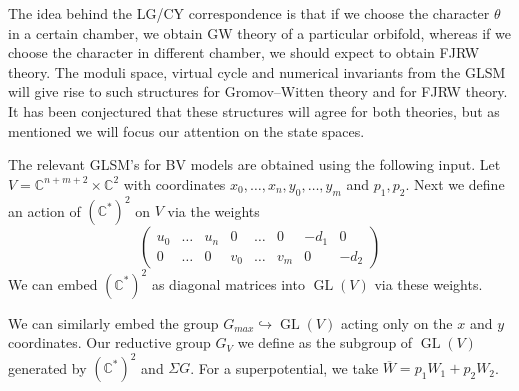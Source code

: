 \documentclass[10pt, letterpaper]{amsart}
\theoremstyle{remark}
\newcommand{\CC}{\mathbb C}
\newcommand{\QQ}{\mathbb{Q}}
\newcommand{\cX}{\mathcal{X}}
\newcommand{\sH}{\mathscr{H}}
\newcommand{\s}[1]{\Sigma #1}
\DeclareMathOperator{\GL}{GL}
\newcommand{\nathan}[1]{\todo[color=pistachio,fancyline]{N:#1}}
\begin{document}
The idea behind the LG/CY correspondence is that if we choose the character $\theta$ in a certain chamber, we obtain GW theory of a particular orbifold, whereas if we choose the character in different chamber, we should expect to obtain FJRW theory. 
The moduli space, virtual cycle and numerical invariants from the GLSM will give rise to such structures for Gromov--Witten theory and for FJRW theory. It has been conjectured that these structures will agree for both theories, but as mentioned we will focus our attention on the state spaces. 



The relevant GLSM's for BV models are obtained using the following input. Let $V=\CC^{n+m+2}\times \CC^2$ with coordinates $x_0,\dots,x_n,y_0,\dots,y_m$ and $p_1,p_2$. Next we define an action of $(\CC^*)^2$ on $V$ via the weights
\[
\left(\begin{matrix}
u_0 & \dots & u_n & 0 & \dots & 0 & -d_1 & 0\\
0 & \dots & 0 & v_0 & \dots & v_m & 0 & -d_2  
\end{matrix}
\right)
\]
We can embed $(\CC^*)^2$ as diagonal matrices into $\GL(V)$ via these weights.

We can similarly embed the group $G_{max}\hookrightarrow \GL(V)$ acting only on the $x$ and $y$ coordinates. Our reductive group $G_V$ we define as the subgroup of $\GL(V)$ generated by $(\CC^*)^2$ and $\s{G}$. 
For a superpotential, we take $\overline{W}=p_1W_1 + p_2W_2$. %
\end{document}

